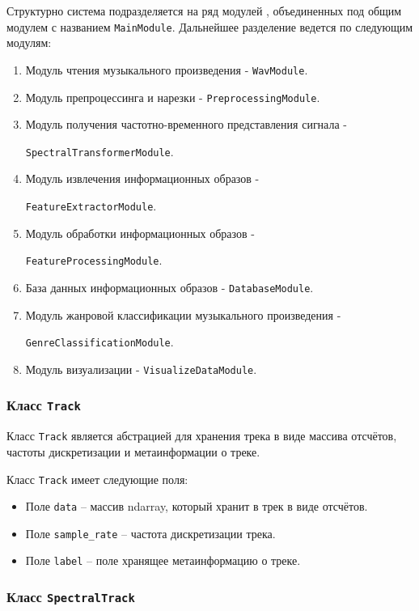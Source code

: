 Структурно система подразделяется на ряд модулей , объединенных под общим модулем с названием \texttt{MainModule}. Дальнейшее разделение ведется по следующим модулям:
\begin{enumerate}[label=\arabic*.]
\item{Модуль чтения музыкального произведения - \texttt{WavModule}.}
\item{Модуль препроцессинга и нарезки - \texttt{PreprocessingModule}.}
\item{Модуль получения частотно-временного представления сигнала -
 
\texttt{SpectralTransformerModule}.}
\item{Модуль извлечения информационных образов -

\texttt{FeatureExtractorModule}.}
\item{Модуль обработки информационных образов - 

\texttt{FeatureProcessingModule}. }
\item{База данных информационных образов - \texttt{DatabaseModule}.}
\item{Модуль жанровой классификации музыкального произведения -

\texttt{GenreClassificationModule}.}
\item{Модуль визуализации - \texttt{VisualizeDataModule}.}
\end{enumerate}


\subsubsection{Класс \texttt{Track}}

Класс \texttt{Track}  является абстрацией для хранения трека в виде массива отсчётов, частоты дискретизации и метаинформации о треке.

Класс \texttt{Track} имеет следующие  поля:
\begin{itemize}
\item{Поле \texttt{data} -- массив ndarray, который хранит в трек в виде отсчётов.}
\item{Поле \texttt{sample\_rate} -- частота дискретизации трека.}
\item{Поле \texttt{label} -- поле хранящее метаинформацию о треке.}
\end{itemize}

\subsubsection{Класс \texttt{SpectralTrack}}

